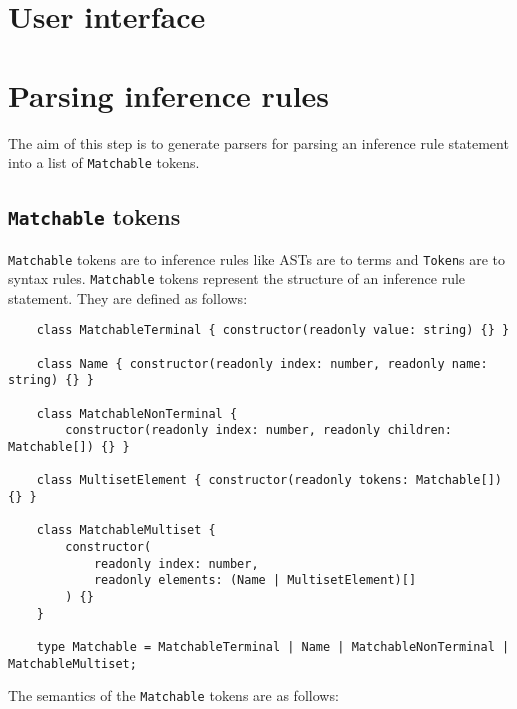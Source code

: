 \section{User interface}
\label{inference:ui}

\section{Parsing inference rules}
\label{inference:parsing}
The aim of this step is to generate parsers for parsing an inference rule statement into a list of \lstinline{Matchable} tokens.

\subsection{\texorpdfstring{\lstinline{Matchable}}{Matchable} tokens}
\lstinline{Matchable} tokens are to inference rules like ASTs are to terms and \lstinline{Token}s are to syntax rules. \lstinline{Matchable} tokens represent the structure of an inference rule statement. They are defined as follows:
\begin{lstlisting}
    class MatchableTerminal { constructor(readonly value: string) {} }

    class Name { constructor(readonly index: number, readonly name: string) {} }

    class MatchableNonTerminal {
        constructor(readonly index: number, readonly children: Matchable[]) {} }

    class MultisetElement { constructor(readonly tokens: Matchable[]) {} }

    class MatchableMultiset {
        constructor(
            readonly index: number,
            readonly elements: (Name | MultisetElement)[]
        ) {}
    }

    type Matchable = MatchableTerminal | Name | MatchableNonTerminal | MatchableMultiset;
\end{lstlisting}
The semantics of the \lstinline{Matchable} tokens are as follows:
